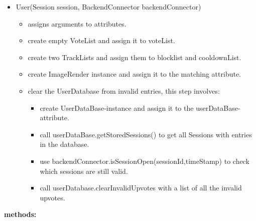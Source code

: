 \documentclass[oneside, ngerman]{sdqtechreport}
\begin{document}
\begin{itemize}
    \item User(Session session, BackendConnector backendConnector)
    \begin{itemize}
        \item assigns arguments to attributes.
        \item create empty VoteList and assign it to voteList.
        \item create two TrackLists and assign them to blocklist and cooldownList.
        \item create ImageRender instance and assign it to the matching attribute. 
        \item clear the UserDatabase from invalid entries, this step involves:
        \begin{itemize}
            \item create UserDataBase-instance and assign it to the userDataBase-attribute.
            \item call userDataBase.getStoredSessions() to get all Sessions with entries in the database.
            \item use backendConnector.isSessionOpen(sessionId,timeStamp) to check which sessions are still valid. 
            \item call userDatabase.clearInvalidUpvotes with a list of all the invalid upvotes.
        \end{itemize}
    \end{itemize}
\end{itemize}
\textbf{methods:}
\end{document}
